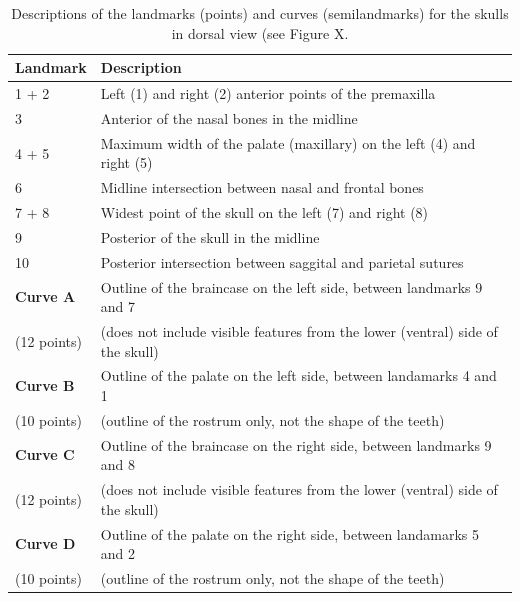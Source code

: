 \begin{table}[h]
\caption[Skulls: dorsal landmarks]
		{Descriptions of the landmarks (points) and curves (semilandmarks) for the skulls in dorsal view (see Figure X.} 
\begin{tabular}[t]{l l}		
\hline
\textbf{Landmark} & \textbf{Description} \\
\hline
1 + 2 & Left (1) and right (2) anterior points of the premaxilla \\
3 & Anterior of the nasal bones in the midline \\
4 + 5 &	Maximum width of the palate (maxillary) on the left (4) and right (5)\\
6 & Midline intersection between nasal and frontal bones \\
7 + 8 & Widest point of the skull on the left (7) and right (8) \\
9 &	Posterior of the skull in the midline \\
10 & Posterior intersection between saggital and parietal sutures \\
\hline
\textbf{Curve A} & Outline of the braincase on the left side, between landmarks 9 and 7\\ 
(12 points) & (does not include visible features from the lower (ventral) side of the skull) \\

\textbf{Curve B} & Outline of the palate on the left side, between landamarks 4 and 1 \\
(10 points) & (outline of the rostrum only, not the shape of the teeth)\\

\textbf{Curve C} &	Outline of the braincase on the right side, between landmarks 9 and 8 \\
(12 points) & (does not include visible features from the lower (ventral) side of the skull) \\

\textbf{Curve D} & Outline of the palate on the right side, between landamarks 5 and 2 \\
(10 points) & (outline of the rostrum only, not the shape of the teeth)\\
\hline
\end{tabular}
\label{tab:skdors}
\end{table}

